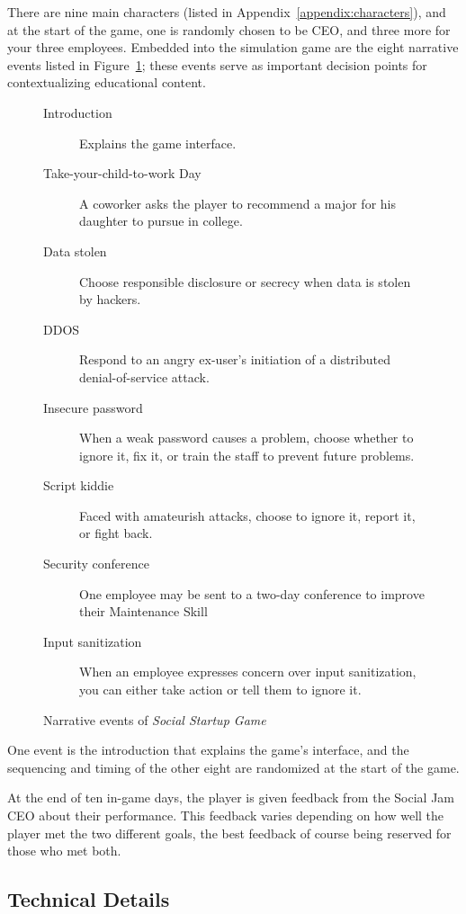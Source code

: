 \documentclass[letterpaper]{article}
\begin{document}
There are nine
main characters (listed in Appendix~\ref{appendix:characters}), and at
the start of the game, one is randomly chosen to be CEO, and three
more for your three employees.
Embedded into the simulation game are the eight narrative events
listed in Figure~\ref{fig:event-list}; these events serve as
important decision points for contextualizing educational content.
%
\begin{figure}
\begin{framed}
\begin{description}
\item[Introduction] Explains the game interface.
\item[Take-your-child-to-work Day] A coworker asks the player to 
 recommend a major for his daughter to pursue in college.
\item[Data stolen] Choose responsible disclosure or secrecy when 
 data is stolen by hackers.
\item[DDOS] Respond to an angry ex-user's initiation of a distributed
 denial-of-service attack.
\item[Insecure password] When a weak password causes a problem,
 choose whether to ignore it, fix it, or train the staff to prevent
 future problems.
\item[Script kiddie] Faced with amateurish attacks, choose to 
 ignore it, report it, or fight back.
\item[Security conference] One employee may be sent to a two-day
 conference to improve their Maintenance Skill
\item[Input sanitization] When an employee expresses concern over
 input sanitization, you can either take action or tell them to ignore it.
\end{description}
\caption{Narrative events of \textit{Social Startup Game}}
\label{fig:event-list}
\end{framed}
\end{figure}
%
One event is the introduction that explains the game's interface,
and the sequencing and timing of the other eight
are randomized at the start of the game. 

At the end of ten in-game days, the player is given feedback from
the Social Jam CEO about their performance. This feedback varies
depending on how well the player met the two different goals, the best
feedback of course being reserved for those who met both.

\subsection{Technical Details}
\end{document}
